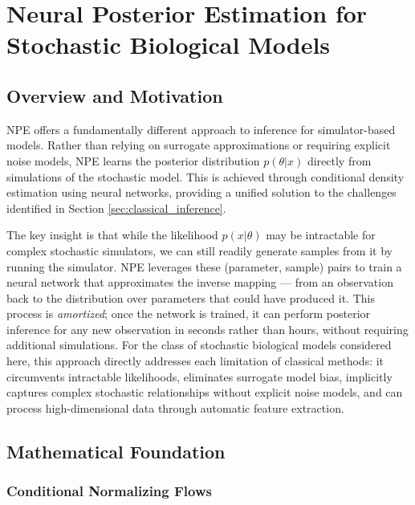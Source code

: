 \documentclass{article}
\begin{document}
\section{Neural Posterior Estimation for Stochastic Biological Models}\label{sec:NPE}

\subsection{Overview and Motivation}
NPE \citep{papamakarios2016fast, greenberg2019automatic,Cranmer2020FrontierSBI} offers a fundamentally different approach to inference for simulator-based models. Rather than relying on surrogate approximations or requiring explicit noise models, NPE learns the posterior distribution $p(\theta | x)$ directly from simulations of the stochastic model. This is achieved through conditional density estimation using neural networks, providing a unified solution to the challenges identified in Section \ref{sec:classical_inference}.

The key insight is that while the likelihood $p(x|\theta)$ may be intractable for complex stochastic simulators, we can still readily generate samples from it by running the simulator. NPE leverages these (parameter, sample) pairs to train a neural network that approximates the inverse mapping — from an observation back to the distribution over parameters that could have produced it. This process is \textit{amortized}; once the network is trained, it can perform posterior inference for any new observation in seconds rather than hours, without requiring additional simulations. For the class of stochastic biological models considered here, this approach directly addresses each limitation of classical methods: it circumvents intractable likelihoods, eliminates surrogate model bias, implicitly captures complex stochastic relationships without explicit noise models, and can process high-dimensional data through automatic feature extraction.

\subsection{Mathematical Foundation}

\subsubsection{Conditional Normalizing Flows}
\end{document}
